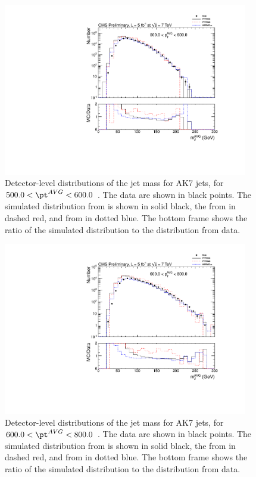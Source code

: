 \begin{figure}[htbp]
\centering
\includegraphics[width=0.95\textwidth]{figs/histAK7MjetVsPtAvg_rawDataMCComparisons_pt_7}
\caption{Detector-level distributions of the jet mass for AK7 jets,
for $500.0 < \pt^{AVG} < 600.0$ \GeVc. The data are shown in black points.
The simulated distribution from \PYTHIA is shown in solid black, 
the from \PYTHIAEIGHT in dashed red, and from \HERWIG in dotted blue. 
The bottom frame shows the ratio of the simulated distribution
to the distribution from data. 
\label{figs:histAK7MjetVsPtAvg_rawDataMCComparisons_pt_7}}
\end{figure}



\begin{figure}[htbp]
\centering
\includegraphics[width=0.95\textwidth]{figs/histAK7MjetVsPtAvg_rawDataMCComparisons_pt_8}
\caption{Detector-level distributions of the jet mass for AK7 jets,
for $600.0 < \pt^{AVG} < 800.0$ \GeVc. The data are shown in black points.
The simulated distribution from \PYTHIA is shown in solid black, 
the from \PYTHIAEIGHT in dashed red, and from \HERWIG in dotted blue. 
The bottom frame shows the ratio of the simulated distribution
to the distribution from data. 
\label{figs:histAK7MjetVsPtAvg_rawDataMCComparisons_pt_8}}
\end{figure}




